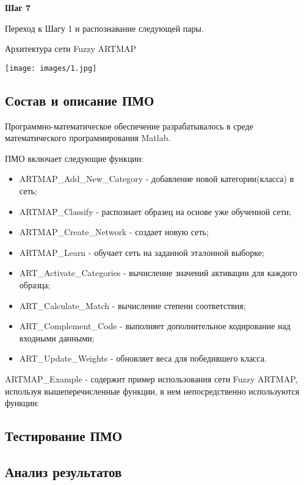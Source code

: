 \textbf{Шаг 7}

Переход к Шагу 1 и распознавание следующей пары.

\begin{center}
	Архитектура сети Fuzzy ARTMAP

	\texttt{[image: images/1.jpg]}
\end{center}




\subsection{Состав и описание ПМО}

Программно-математическое обеспечение разрабатывалось в среде математического программирования Matlab.

ПМО включает следующие функции:
\begin{itemize}
	\item ARTMAP_Add_New_Category - добавление новой категории(класса) в сеть;
	\item ARTMAP_Classify - распознает образец на основе уже обученной сети;
	\item ARTMAP_Create_Network - создает новую сеть;
	\item ARTMAP_Learn - обучает сеть на заданной эталонной выборке;
	\item ART_Activate_Categories - вычисление значений активации для каждого образца;
	\item ART_Calculate_Match - вычисление степени соответствия;
	\item ART_Complement_Code - выполняет дополнительное кодирование над входными данными;
	\item ART_Update_Weights - обновляет веса для победившего класса.
\end{itemize}

ARTMAP_Example - содержит пример использования сети Fuzzy ARTMAP, используя вышеперечисленные функции, в нем непосредственно используются функции:


\subsection{Тестирование ПМО}


\subsection{Анализ результатов}
